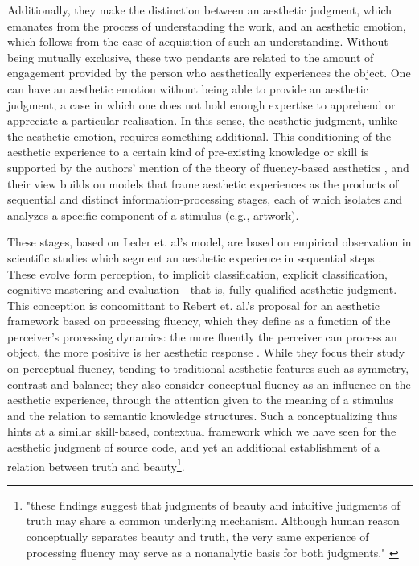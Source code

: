 Additionally, they make the distinction between an aesthetic judgment, which emanates from the process of understanding the work, and an aesthetic emotion, which follows from the ease of acquisition of such an understanding. Without being mutually exclusive, these two pendants are related to the amount of engagement provided by the person who aesthetically experiences the object. One can have an aesthetic emotion without being able to provide an aesthetic judgment, a case in which one does not hold enough expertise to apprehend or appreciate a particular realisation. In this sense, the aesthetic judgment, unlike the aesthetic emotion, requires something additional. This conditioning of the aesthetic experience to a certain kind of pre-existing knowledge or skill is supported by the authors' mention of the theory of fluency-based aesthetics \citep{chatterjee_neuroscience_2016}, and their view builds on models that frame aesthetic experiences as the products of sequential and distinct information-processing stages, each of which isolates and analyzes a specific component of a stimulus (e.g., artwork).

These stages, based on Leder et. al's model, are based on empirical observation in scientific studies which segment an aesthetic experience in sequential steps \citep{leder_model_2004}. These evolve form perception, to implicit classification, explicit classification, cognitive mastering and evaluation—that is, fully-qualified aesthetic judgment. This conception is concomittant to Rebert et. al.'s proposal for an aesthetic framework based on processing fluency, which they define as a function of the perceiver's processing dynamics: the more fluently the perceiver can process an object, the more positive is her aesthetic response \citep{reber_processing_2004}. While they focus their study on perceptual fluency, tending to traditional aesthetic features such as symmetry, contrast and balance; they also consider conceptual fluency as an influence on the aesthetic experience, through the attention given to the meaning of a stimulus and the relation to semantic knowledge structures. Such a conceptualizing thus hints at a similar skill-based, contextual framework which we have seen for the aesthetic judgment of source code, and yet an additional establishment of a relation between truth and beauty\footnote{"these findings suggest that judgments of beauty and intuitive judgments of truth may share a common underlying mechanism. Although human reason conceptually separates beauty and truth, the very same experience of processing fluency may serve as a nonanalytic basis for both judgments." \citep{reber_processing_2004}}.

